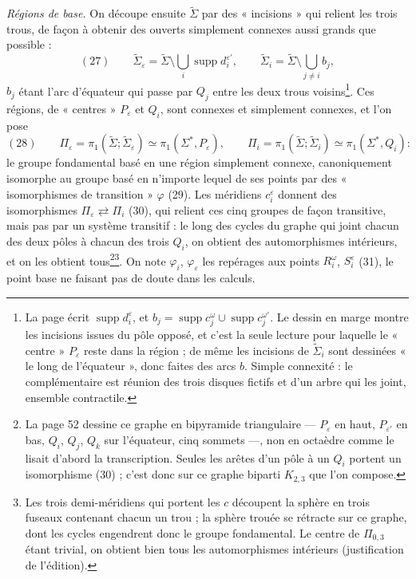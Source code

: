 \documentclass[11pt,a4paper]{article}
\begin{document}
\emph{Régions de base.} On découpe ensuite $\widetilde\Sigma$ par des
« incisions » qui relient les trois trous, de façon à obtenir des ouverts
simplement connexes aussi grands que possible :
\[
(27)\qquad \widetilde\Sigma_\varepsilon = \widetilde\Sigma \setminus \bigcup_{i} \operatorname{supp} d_i^{\varepsilon'}, \qquad
\widetilde\Sigma_i = \widetilde\Sigma \setminus \bigcup_{j \neq i} b_j ,
\]
$b_j$ étant l'arc d'équateur qui passe par $Q_j$ entre les deux trous
voisins\footnote{La page écrit $\operatorname{supp} d_i^{\varepsilon}$, et
$b_j = \operatorname{supp} c_j^{\omega} \cup \operatorname{supp} c_j^{\omega'}$.
Le dessin en marge montre les incisions issues du pôle opposé, et c'est la
seule lecture pour laquelle le « centre » $P_\varepsilon$ reste dans la région
; de même les incisions de $\widetilde\Sigma_i$ sont dessinées « le long de
l'équateur », donc faites des arcs $b$. Simple connexité : le complémentaire
est réunion des trois disques fictifs et d'un arbre qui les joint, ensemble
contractile.}. Ces régions, de « centres » $P_\varepsilon$ et $Q_i$, sont
connexes et simplement connexes, et l'on pose
\[
(28)\qquad \Pi_\varepsilon = \pi_1(\widetilde\Sigma; \widetilde\Sigma_\varepsilon) \simeq \pi_1(\Sigma^{*}, P_\varepsilon), \qquad
\Pi_i = \pi_1(\widetilde\Sigma; \widetilde\Sigma_i) \simeq \pi_1(\Sigma^{*}, Q_i) :
\]
le groupe fondamental basé en une région simplement connexe, canoniquement
isomorphe au groupe basé en n'importe lequel de ses points par des
« isomorphismes de transition » $\varphi$ (29). Les méridiens $c_i^{\varepsilon}$
donnent des isomorphismes $\Pi_\varepsilon \rightleftarrows \Pi_i$ (30), qui
relient ces cinq groupes de façon transitive, mais pas par un système
transitif : le long des cycles du graphe qui joint chacun des deux pôles à
chacun des trois $Q_i$, on obtient des automorphismes intérieurs, et on les
obtient tous\footnote{La page 52 dessine ce graphe en bipyramide triangulaire
--- $P_\varepsilon$ en haut, $P_{\varepsilon'}$ en bas, $Q_i$, $Q_j$, $Q_k$ sur
l'équateur, cinq sommets ---, non en octaèdre comme le lisait d'abord la
transcription. Seules les arêtes d'un pôle à un $Q_i$ portent un isomorphisme
(30) ; c'est donc sur ce graphe biparti $K_{2,3}$ que l'on compose.}\footnote{Les trois demi-méridiens qui portent les $c$ découpent la sphère
en trois fuseaux contenant chacun un trou ; la sphère trouée se rétracte sur
ce graphe, dont les cycles engendrent donc le groupe fondamental. Le centre de
$\Pi_{0,3}$ étant trivial, on obtient bien tous les automorphismes intérieurs
(justification de l'édition).}. On note $\varphi_i$, $\varphi_\varepsilon$ les
repérages aux points $R_i^{\omega}$, $S_i^{\varepsilon}$ (31), le point base ne
faisant pas de doute dans les calculs.
\end{document}
